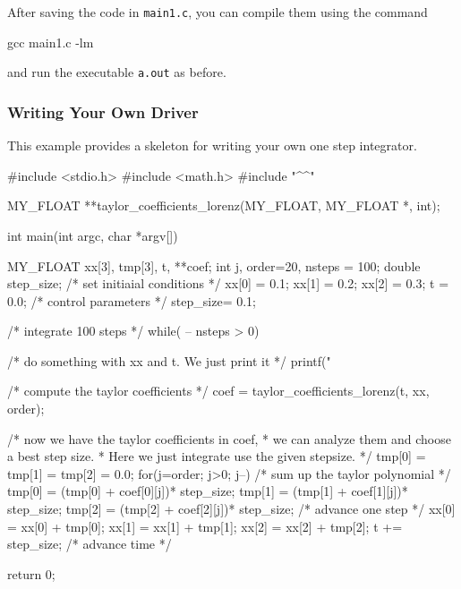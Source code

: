 \documentclass[10pt]{article}
\theoremstyle{remark}
\newcommand{\odecfile}{}
\newcommand{\odehfile}{}
\begin{document}
\noindent
After saving the code in \verb+main1.c+, you can compile them using
the command
\begin{command}
   gcc \odecfile{} main1.c -lm
\end{command}
and run the executable \verb+a.out+ as before.


\subsubsection*{Writing Your Own Driver}

This example provides a skeleton for writing your own one step
integrator.

\begin{code}[title={File {\tt main2.c}}]
    #include <stdio.h>
    #include <math.h>
    #include "^\odehfile{}^"
    
    MY_FLOAT **taylor_coefficients_lorenz(MY_FLOAT, MY_FLOAT *, int);
    
    int main(int argc, char *argv[])
    {
       MY_FLOAT  xx[3], tmp[3], t, **coef;
       int       j, order=20, nsteps = 100;
       double    step_size;
       /* set initiaial conditions */
       xx[0] = 0.1;
       xx[1] = 0.2;
       xx[2] = 0.3;
       t     = 0.0;
       /* control parameters   */
       step_size= 0.1;
    
       /* integrate 100 steps */
       while( -- nsteps > 0) {
          /* do something with xx and t. We just print it */
          printf("%
    
          /* compute the taylor coefficients */
          coef = taylor_coefficients_lorenz(t, xx, order);
    
          /* now we have the taylor coefficients in coef,
           * we can analyze them and choose a best step size.
           * Here we just integrate use the given stepsize.
           */
           tmp[0] = tmp[1] = tmp[2] = 0.0;
           for(j=order; j>0; j--) /* sum up the taylor polynomial */
             { 
               tmp[0] = (tmp[0] + coef[0][j])* step_size;
               tmp[1] = (tmp[1] + coef[1][j])* step_size;
               tmp[2] = (tmp[2] + coef[2][j])* step_size;
             }
            /* advance one step */
            xx[0] = xx[0] + tmp[0];
            xx[1] = xx[1] + tmp[1];
            xx[2] = xx[2] + tmp[2];
            t += step_size; /* advance time */
         }
        return 0;
    }
\end{code}

\appendix
\end{document}
